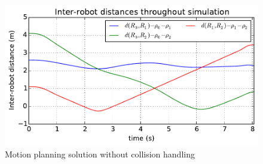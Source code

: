 \documentclass[eprint]{actapoly}
\begin{document}
\begin{figure}[!h]
  \includegraphics[width=\linewidth]{./images/collision/multirobot-interr.pdf} %
  \caption{Motion planning solution without collision handling\label{fig:collision}}
\label{fig:res}
\end{figure}
\end{document}
